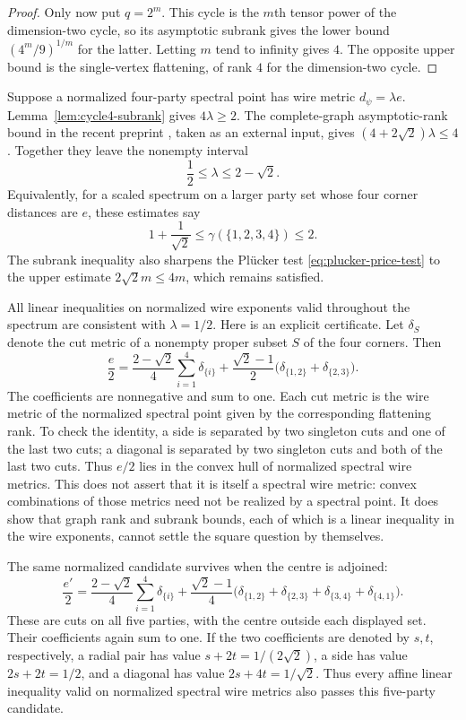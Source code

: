 \begin{proof}
Only now put $q=2^m$. This cycle is the $m$th tensor power of the
dimension-two cycle, so its asymptotic subrank gives the lower bound
$(4^m/9)^{1/m}$ for the latter. Letting $m$ tend to infinity gives
$4$. The opposite upper bound is the single-vertex flattening, of
rank $4$ for the dimension-two cycle.
\end{proof}

Suppose a normalized four-party spectral point has wire metric $d_\psi=\lambda e$. Lemma~\ref{lem:cycle4-subrank} gives $4\lambda\geq2$. The complete-graph asymptotic-rank bound in the recent preprint \cite[Theorem 1.1]{Zhou2026}, taken as an external input, gives
$(4+2\sqrt2)\lambda\leq4$. Together they leave the nonempty interval
\begin{equation}\label{eq:square-scale-interval}
 \frac12\leq\lambda\leq2-\sqrt2.
\end{equation}
Equivalently, for a scaled spectrum on a larger party set whose four corner distances are $e$, these estimates say
\[
 1+\frac1{\sqrt2}\leq\gamma(\{1,2,3,4\})\leq2.
\]
The subrank inequality also sharpens the Pl\"ucker test \eqref{eq:plucker-price-test} to the upper estimate $2\sqrt2m\leq4m$, which remains satisfied.

All linear inequalities on normalized wire exponents valid throughout the spectrum are consistent with $\lambda=1/2$. Here is an explicit certificate. Let $\delta_S$ denote the cut metric of a nonempty proper subset $S$ of the four corners. Then
\begin{equation}\label{eq:square-convex-cuts}
 \frac e2=
 \frac{2-\sqrt2}{4}\sum_{i=1}^4\delta_{\{i\}}
 +\frac{\sqrt2-1}{2}
   \bigl(\delta_{\{1,2\}}+\delta_{\{2,3\}}\bigr).
\end{equation}
The coefficients are nonnegative and sum to one. Each cut metric is the wire metric of the normalized spectral point given by the corresponding flattening rank. To check the identity, a side is separated by two singleton cuts and one of the last two cuts; a diagonal is separated by two singleton cuts and both of the last two cuts. Thus $e/2$ lies in the convex hull of normalized spectral wire metrics. This does not assert that it is itself a spectral wire metric: convex combinations of those metrics need not be realized by a spectral point. It does show that graph rank and subrank bounds, each of which is a linear inequality in the wire exponents, cannot settle the square question by themselves.

The same normalized candidate survives when the centre is adjoined:
\begin{equation}\label{eq:centred-square-convex-cuts}
 \frac{e'}2=
 \frac{2-\sqrt2}{4}\sum_{i=1}^4\delta_{\{i\}}
 +\frac{\sqrt2-1}{4}
  \bigl(\delta_{\{1,2\}}+\delta_{\{2,3\}}+
        \delta_{\{3,4\}}+\delta_{\{4,1\}}\bigr).
\end{equation}
These are cuts on all five parties, with the centre outside each displayed set. Their coefficients again sum to one. If the two coefficients are denoted by $s,t$, respectively, a radial pair has value $s+2t=1/(2\sqrt2)$, a side has value $2s+2t=1/2$, and a diagonal has value $2s+4t=1/\sqrt2$. Thus every affine linear inequality valid on normalized spectral wire metrics also passes this five-party candidate.

